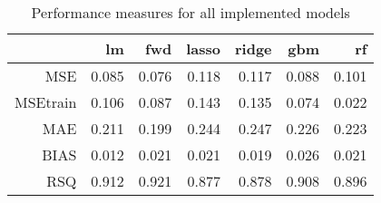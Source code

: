 \begin{table}[H]
\centering
\begin{tabular}{rrrrrrr}
  \hline
 & lm & fwd & lasso & ridge & gbm & rf \\ 
  \hline
MSE & 0.085 & 0.076 & 0.118 & 0.117 & 0.088 & 0.101 \\ 
  MSEtrain & 0.106 & 0.087 & 0.143 & 0.135 & 0.074 & 0.022 \\ 
  MAE & 0.211 & 0.199 & 0.244 & 0.247 & 0.226 & 0.223 \\ 
  BIAS & 0.012 & 0.021 & 0.021 & 0.019 & 0.026 & 0.021 \\ 
  RSQ & 0.912 & 0.921 & 0.877 & 0.878 & 0.908 & 0.896 \\ 
   \hline
\end{tabular}
\caption{Performance measures for all implemented models} 
\label{tab:measures}
\end{table}
